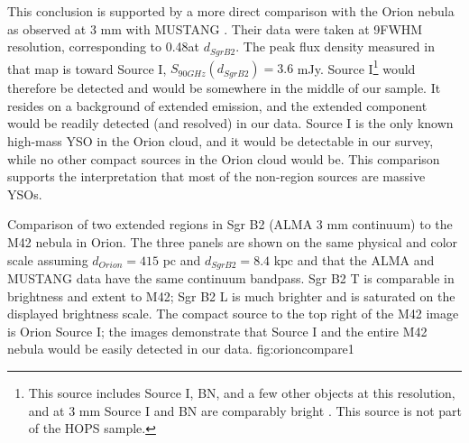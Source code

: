 \documentclass[twocolumn]{aastex61}
\newcommand{\dsgrb}{\ensuremath{8.4\textrm{~kpc}}\xspace}
\begin{document}
This conclusion is supported by a more direct comparison with the Orion nebula
as observed at 3 mm with MUSTANG \citep[][Figure
\ref{fig:orioncompare}]{Dicker2009a}.  Their data were taken at
9\arcsec FWHM resolution, corresponding to 0.48\arcsec at $d_{Sgr B2}$.  The
peak flux density measured in that map is toward Source I, $S_{90 GHz}(d_{Sgr
B2}) = 3.6$ mJy.  Source I\footnote{This source includes Source I, BN, and a few
other objects at this resolution, and at 3 mm Source I and BN are comparably
bright \citep{Plambeck2013a}.  This source is not part of the HOPS sample.}
would therefore  be detected and would be
somewhere in the middle of our sample.  It resides on a background of
extended emission, and the
extended component would be readily detected (and resolved) in our data. 
Source I is the only known high-mass YSO in the Orion cloud, and it would
be detectable in our survey, while no other compact sources in the Orion cloud
would be.  This comparison supports the interpretation that most of the
non-\hii region sources are massive YSOs.


{Comparison of two extended \hii regions in Sgr B2 (ALMA 3 mm continuum) to the
M42 \citep[GBT MUSTANG 3 mm continuum;][]{Dicker2009a} nebula in Orion.
The three panels are shown on the same physical and color scale assuming
$d_{Orion} = 415$ pc and $d_{Sgr B2} = $\dsgrb and that the ALMA and MUSTANG
data have the same continuum bandpass.  Sgr B2 \hii T is comparable in
brightness and extent to M42; Sgr B2 \hii L is much brighter and is saturated
on the displayed brightness scale.  The compact source to the top right of the
M42 image is Orion Source I; the images demonstrate that Source I and the entire
M42 nebula would be easily detected in our data.
}
{fig:orioncompare}{1}{\textwidth}
\end{document}
